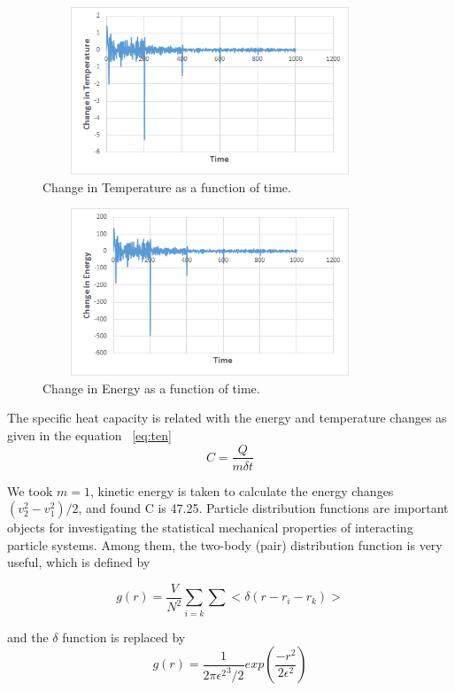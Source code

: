\documentclass[]{article}
\begin{document}
\begin{figure}[h]
  \centering
  \includegraphics[width=10cm,height=5cm]{figures/chTemp}
  \caption{\label{fig:chTemp} Change in Temperature as a function of time.}
\end{figure}

\begin{figure}[h]
  \centering
  \includegraphics[width=10cm,height=5cm]{figures/chEng}
  \caption{\label{fig:chEng} Change in Energy as a function of time.}
\end{figure}

The specific heat capacity is related with the energy and temperature changes as given in the equation ~\ref{eq:ten}
\begin{equation}
\label{eq:ten}
C = \frac{Q}{m\delta t}
\end{equation}

We took $m=1$, kinetic energy is taken to calculate the energy changes $(v_2^2-v_1^2)/2$, and found C is 47.25.
Particle distribution functions are important objects for investigating the statistical mechanical properties of interacting particle systems. Among them, the two-body (pair) distribution function is very useful, which is defined by

\begin{equation}
\label{eq:eleven}
g(r) = \frac{V}{N^2} \sum_{i=k}{\sum{<\delta(r-r_i-r_k)>}}
\end{equation}

and the $\delta$ function is replaced by
\begin{equation}
\label{eq:twelve}
g(r) = \frac{1}{{2\pi \epsilon^2}^3/2} exp(\frac{-r^2}{2\epsilon^2})
\end{equation}
\end{document}
